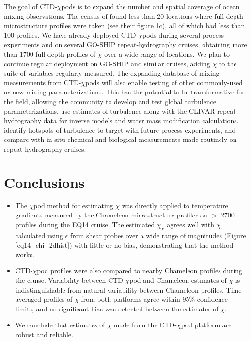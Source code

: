 \documentclass{ametsoc}
\begin{document}
The goal of CTD-$\chi$pods is to expand the number and spatial coverage of ocean mixing observations. The census of \cite{waterhouseetal14} found less than 20 locations where full-depth microstructure profiles were taken (see their figure 1c), all of which had less than 100 profiles. We have already deployed CTD $\chi$pods during several process experiments and on several GO-SHIP repeat-hydrography cruises, obtaining more than 1700 full-depth profiles of $\chi$ over a wide range of locations. We plan to continue regular deployment on GO-SHIP and similar cruises, adding $\chi$ to the suite of variables regularly measured. The expanding database of mixing measurements from CTD-$\chi$pods will also enable testing of other commonly-used or new mixing parameterizations. This has the potential to be transformative for the field, allowing the community to develop and test global turbulence parameterizations, use estimates of turbulence along with the CLIVAR repeat hydrography data for inverse models and water mass modification calculations, identify hotspots of turbulence to target with future process experiments, and compare with in-situ chemical and biological measurements made routinely on repeat hydrography cruises.


\section{Conclusions}

\begin{itemize}
\item The $\chi$pod method for estimating $\chi$ was directly applied to temperature gradients measured by the Chameleon microstructure profiler on $>$ 2700 profiles during the EQ14 cruise. The estimated $\chi_{\chi}$ agrees well with $\chi_{\epsilon}$ calculated using $\epsilon$ from shear probes over a wide range of magnitudes (Figure \ref{eq14_chi_2dhist}) with little or no bias, demonstrating that the method works.
\item CTD-$\chi$pod profiles were also compared to nearby Chameleon profiles during the cruise. Variability between CTD-$\chi$pod and Chameleon estimates of $\chi$ is indistinguishable from natural variability between Chameleon profiles. Time-averaged profiles of $\chi$ from both platforms agree within 95\% confidence limits, and no significant bias was detected between the estimates of $\chi$.
\item We conclude that estimates of $\chi$ made from the CTD-$\chi$pod platform are robust and reliable.
\end{itemize}
\end{document}
